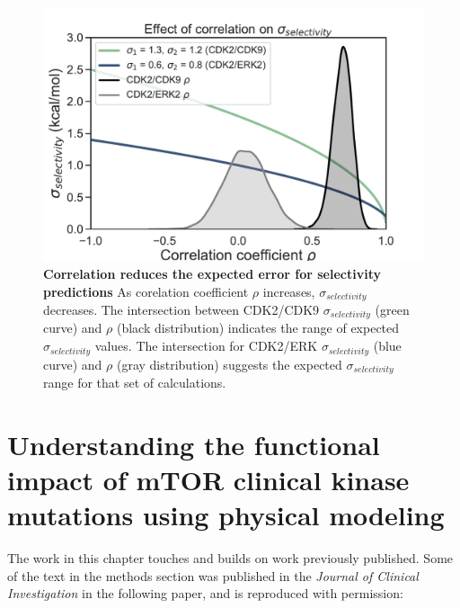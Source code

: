 \documentclass[phd,tocprelim]{cornell}
\begin{document}
\begin{landscape}
\begin{figure}[p]
\centering
\includegraphics[width=0.8\linewidth]{figures/supp_figure3.pdf}
\caption[Correlation reduces the expected error for selectivity predictions]{
{\bf Correlation reduces the expected error for selectivity predictions}
As corelation coefficient $\rho$ increases, $\sigma_{selectivity}$ decreases. The intersection between CDK2/CDK9 $\sigma_{selectivity}$ (green curve) and $\rho$ (black distribution) indicates the range of expected $\sigma_{selectivity}$ values. The intersection for CDK2/ERK $\sigma_{selectivity}$ (blue curve) and $\rho$ (gray distribution) suggests the expected $\sigma_{selectivity}$ range for that set of calculations. 
}
\label{fig:sup-figure-3}
\end{figure}
\end{landscape}

\chapter{Understanding the functional impact of mTOR clinical kinase mutations using physical modeling}

The work in this chapter touches and builds on work previously published. Some of the text in the methods section was published in the \emph{Journal of Clinical Investigation} in the following paper, and is reproduced with permission: 
\end{document}
